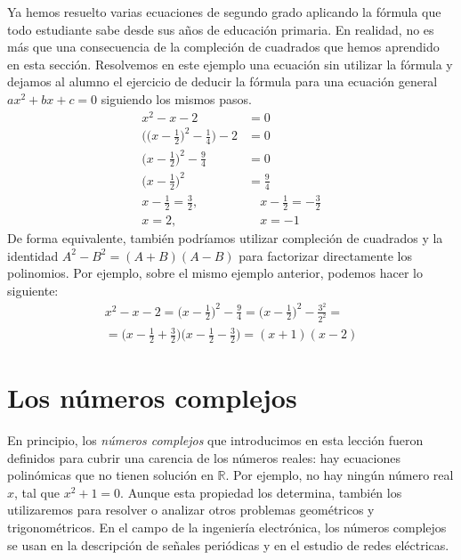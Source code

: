 \begin{ejemplo}
Ya hemos resuelto varias ecuaciones de segundo grado aplicando la fórmula que todo estudiante sabe desde sus años de educación primaria.
En realidad, no es más que una consecuencia de la compleción de cuadrados que hemos aprendido en esta sección.
Resolvemos en este ejemplo una ecuación sin utilizar la fórmula y dejamos al alumno el ejercicio de deducir la fórmula para una ecuación general $ax^2+bx+c=0$ siguiendo los mismos pasos.
%
\begin{align*}
x^2-x-2 & = 0 \\
\Big(\Big(x-\frac12\Big)^2-\frac14\Big)-2 & = 0 \\
\Big(x-\frac12\Big)^2-\frac94 & = 0 \\
\Big(x-\frac12\Big)^2 &= \frac94 \\
x-\frac12 = \frac32, \quad &\quad x-\frac12 = -\frac32 \\
x = 2, \quad &\quad x = -1 
\end{align*}
De forma equivalente, también podríamos utilizar compleción de cuadrados y la identidad $A^2-B^2=(A+B)(A-B)$ para factorizar directamente los polinomios.
Por ejemplo, sobre el mismo ejemplo anterior, podemos hacer lo siguiente:
\begin{multline*}
x^2-x-2 = \Big(x-\frac12\Big)^2-\frac94=\Big(x-\frac12\Big)^2-\frac{3^2}{2^2}=\\
=\Big(x-\frac12+\frac32\Big)\Big(x-\frac12-\frac32\Big)
=(x+1)(x-2)
\tag*{\fej}
\end{multline*}

\end{ejemplo}




\newpage

\section{Los números complejos}\label{lec:complejos}

En principio, los \emph{números complejos} que introducimos en esta lección fueron definidos para cubrir una carencia de los números reales: hay ecuaciones polinómicas que no tienen solución en $\mathbb{R}$.
Por ejemplo, no hay ningún número real $x$, tal que $x^2+1=0$.
Aunque esta propiedad los determina, también los utilizaremos para resolver o analizar otros problemas geométricos y trigonométricos.
En el campo de la ingeniería electrónica, los números complejos se usan en la descripción de señales periódicas y en el estudio de redes eléctricas.

